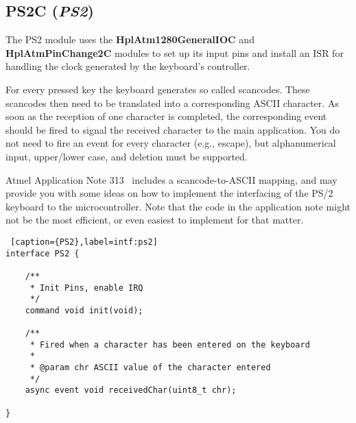 \documentclass[a4paper,10pt]{article}
\newenvironment{hint}[1][Hint]{%
	\begin{bclogo}[noborder=true,logo=\bclampe]{#1}
}
{\end{bclogo}}
\newcommand{\module}[1]{\textbf{#1}}
\def\interface#1{{\em #1\/}}
\begin{document}
%
%
%
%
%
%

\subsection{PS2C (\interface{PS2})}

The PS2 module uses the \module{HplAtm1280GeneralIOC} and
	\module{HplAtmPinChange2C} modules to set up its input pins and
	install an ISR for handling the clock generated by the keyboard's
	controller.

For every pressed key the keyboard generates so called scancodes.
These scancodes then need to be translated into a corresponding ASCII
	character.
As soon as the reception of one character is completed, the corresponding
	event should be fired to signal the received character to the main
	application.
You do not need to fire an event for every character (e.g., escape), but
	alphanumerical input, upper/lower case, and deletion must be supported.

Atmel Application Note 313~\cite{appnote:avr313} includes a scancode-to-ASCII
	mapping, and may provide you with some ideas on how to implement the
	interfacing of the PS/2 keyboard to the microcontroller.
Note that the code in the application note might not be the most efficient, or
	even easiest to implement for that matter.


\begin{lstlisting} [caption={PS2},label=intf:ps2]
interface PS2 {

	/**
	 * Init Pins, enable IRQ
	 */
	command void init(void);

	/**
	 * Fired when a character has been entered on the keyboard
	 *
	 * @param chr ASCII value of the character entered
	 */
	async event void receivedChar(uint8_t chr);

}
\end{lstlisting}
\end{document}
